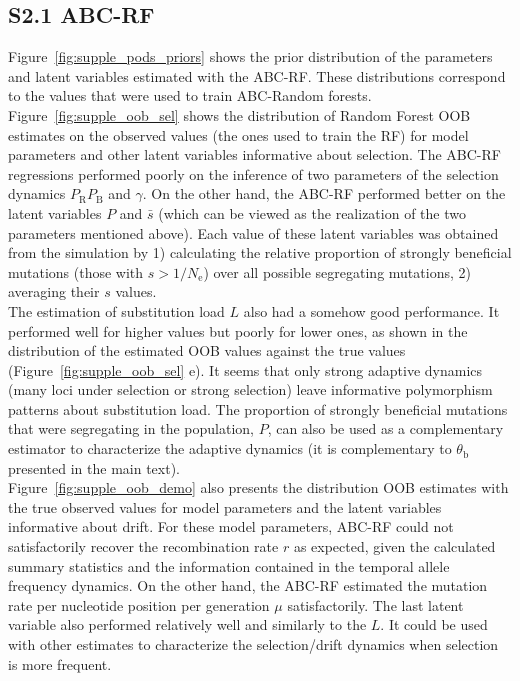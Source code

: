\documentclass[a4paper, 12pt]{article}
\begin{document}
\subsection*{S2.1 ABC-RF}

Figure~\ref{fig:supple_pods_priors} shows the prior distribution of the parameters and latent variables estimated with the ABC-RF. These distributions correspond to the values that were used to train ABC-Random forests.\\

Figure~\ref{fig:supple_oob_sel} shows the distribution of Random Forest OOB estimates on the observed values (the ones used to train the RF) for model parameters and other latent variables informative about selection. The ABC-RF regressions performed poorly on the inference of two parameters of the selection dynamics $P_{\mathrm{R}}P_{\mathrm{B}}$ and $\gamma$. On the other hand, the ABC-RF performed better on the latent variables $P$ and $\bar{s}$ (which can be viewed as the realization of the two parameters mentioned above). Each value of these latent variables was obtained from the simulation by 1) calculating the relative proportion of strongly beneficial mutations (those with $s > 1/N_{\mathrm{e}}$) over all possible segregating mutations, 2) averaging their $s$ values.\\

The estimation of substitution load $L$ also had a somehow good performance. It performed well for higher values but poorly for lower ones, as shown in the distribution of the estimated OOB values against the true values (Figure~\ref{fig:supple_oob_sel} e). It seems that only strong adaptive dynamics (many loci under selection or strong selection) leave informative polymorphism patterns about substitution load. The proportion of strongly beneficial mutations that were segregating in the population, $P$, can also be used as a complementary estimator to characterize the adaptive dynamics (it is complementary to $\theta_{\mathrm{b}}$ presented in the main text).\\

Figure~\ref{fig:supple_oob_demo} also presents the distribution OOB estimates with the true observed values for model parameters and the latent variables informative about drift. For these model parameters, ABC-RF could not satisfactorily recover the recombination rate $r$ as expected, given the calculated summary statistics and the information contained in the temporal allele frequency dynamics. On the other hand, the ABC-RF estimated the mutation rate per nucleotide position per generation $\mu$ satisfactorily. The last latent variable also performed relatively well and similarly to the $L$. It could be used with other estimates to characterize the selection/drift dynamics when selection is more frequent.\\
\end{document}
